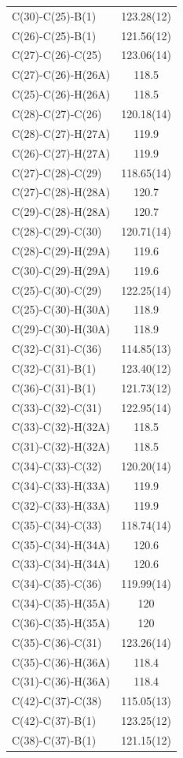 \begin{center}
{\begin{supertabular}{p{1.5in}c}
C(30)-C(25)-B(1)&123.28(12)\\
C(26)-C(25)-B(1)&121.56(12)\\
C(27)-C(26)-C(25)&123.06(14)\\
C(27)-C(26)-H(26A)&118.5\\
C(25)-C(26)-H(26A)&118.5\\
C(28)-C(27)-C(26)&120.18(14)\\
C(28)-C(27)-H(27A)&119.9\\
C(26)-C(27)-H(27A)&119.9\\
C(27)-C(28)-C(29)&118.65(14)\\
C(27)-C(28)-H(28A)&120.7\\
C(29)-C(28)-H(28A)&120.7\\
C(28)-C(29)-C(30)&120.71(14)\\
C(28)-C(29)-H(29A)&119.6\\
C(30)-C(29)-H(29A)&119.6\\
C(25)-C(30)-C(29)&122.25(14)\\
C(25)-C(30)-H(30A)&118.9\\
C(29)-C(30)-H(30A)&118.9\\
C(32)-C(31)-C(36)&114.85(13)\\
C(32)-C(31)-B(1)&123.40(12)\\
C(36)-C(31)-B(1)&121.73(12)\\
C(33)-C(32)-C(31)&122.95(14)\\
C(33)-C(32)-H(32A)&118.5\\
C(31)-C(32)-H(32A)&118.5\\
C(34)-C(33)-C(32)&120.20(14)\\
C(34)-C(33)-H(33A)&119.9\\
C(32)-C(33)-H(33A)&119.9\\
C(35)-C(34)-C(33)&118.74(14)\\
C(35)-C(34)-H(34A)&120.6\\
C(33)-C(34)-H(34A)&120.6\\
C(34)-C(35)-C(36)&119.99(14)\\
C(34)-C(35)-H(35A)&120\\
C(36)-C(35)-H(35A)&120\\
C(35)-C(36)-C(31)&123.26(14)\\
C(35)-C(36)-H(36A)&118.4\\
C(31)-C(36)-H(36A)&118.4\\
C(42)-C(37)-C(38)&115.05(13)\\
C(42)-C(37)-B(1)&123.25(12)\\
C(38)-C(37)-B(1)&121.15(12)\\

\end{supertabular}}
\end{center}
